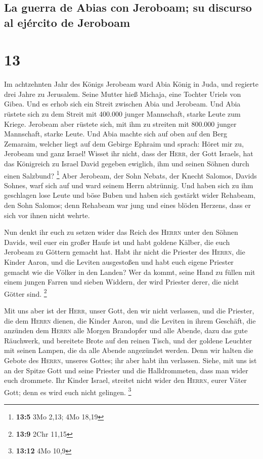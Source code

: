 \hypertarget{la-guerra-de-abias-con-jeroboam-su-discurso-al-ejuxe9rcito-de-jeroboam}{%
\subsection{La guerra de Abias con Jeroboam; su discurso al ejército de
Jeroboam}\label{la-guerra-de-abias-con-jeroboam-su-discurso-al-ejuxe9rcito-de-jeroboam}}

\hypertarget{section-12}{%
\section{13}\label{section-12}}

 Im achtzehnten Jahr des Königs Jerobeam ward Abia König
in Juda,  und regierte drei Jahre zu Jerusalem. Seine
Mutter hieß Michaja, eine Tochter Uriels von Gibea. Und es erhob sich
ein Streit zwischen Abia und Jerobeam.  Und Abia rüstete
sich zu dem Streit mit 400.000 junger Mannschaft, starke Leute zum
Kriege. Jerobeam aber rüstete sich, mit ihm zu streiten mit 800.000
junger Mannschaft, starke Leute.  Und Abia machte sich auf
oben auf den Berg Zemaraim, welcher liegt auf dem Gebirge Ephraim und
sprach: Höret mir zu, Jerobeam und ganz Israel!  Wisset
ihr nicht, dass der \textsc{Herr}, der Gott Israels, hat das Königreich
zu Israel David gegeben ewiglich, ihm und seinen Söhnen durch einen
Salzbund? \footnote{\textbf{13:5} 3Mo 2,13; 4Mo 18,19} 
Aber Jerobeam, der Sohn Nebats, der Knecht Salomos, Davids Sohnes, warf
sich auf und ward seinem Herrn abtrünnig.  Und haben sich
zu ihm geschlagen lose Leute und böse Buben und haben sich gestärkt
wider Rehabeam, den Sohn Salomos; denn Rehabeam war jung und eines
blöden Herzens, dass er sich vor ihnen nicht wehrte.

 Nun denkt ihr euch zu setzen wider das Reich des
\textsc{Herrn} unter den Söhnen Davids, weil euer ein großer Haufe ist
und habt goldene Kälber, die euch Jerobeam zu Göttern gemacht hat.
 Habt ihr nicht die Priester des \textsc{Herrn}, die
Kinder Aaron, und die Leviten ausgestoßen und habt euch eigene Priester
gemacht wie die Völker in den Landen? Wer da kommt, seine Hand zu füllen
mit einem jungen Farren und sieben Widdern, der wird Priester derer, die
nicht Götter sind. \footnote{\textbf{13:9} 2Chr 11,15}

 Mit uns aber ist der \textsc{Herr}, unser Gott, den wir
nicht verlassen, und die Priester, die dem \textsc{Herrn} dienen, die
Kinder Aaron, und die Leviten in ihrem Geschäft,  die
anzünden dem \textsc{Herrn} alle Morgen Brandopfer und alle Abende, dazu
das gute Räuchwerk, und bereitete Brote auf den reinen Tisch, und der
goldene Leuchter mit seinen Lampen, die da alle Abende angezündet
werden. Denn wir halten die Gebote des \textsc{Herrn}, unseres Gottes;
ihr aber habt ihn verlassen.  Siehe, mit uns ist an der
Spitze Gott und seine Priester und die Halldrommeten, dass man wider
euch drommete. Ihr Kinder Israel, streitet nicht wider den
\textsc{Herrn}, eurer Väter Gott; denn es wird euch nicht gelingen.
\footnote{\textbf{13:12} 4Mo 10,9}

